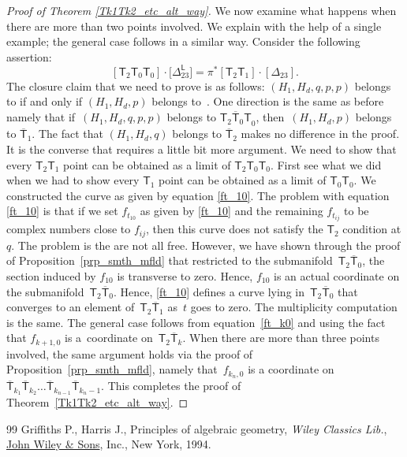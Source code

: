 \documentclass[11pt]{article}
\numberwithin{equation}{section}
\begin{document}
\begin{proof}[Proof of Theorem \ref{Tk1Tk2_etc_alt_way}]
We now examine what happens when there are more than two points involved.
We explain with the help of a single example; the general case follows in a similar way.
Consider the following assertion:
\[
[\mathsf{T}_2 \mathsf{T}_0 \mathsf{T}_0] \cdot \bigl[\Delta^{\mathsf{L}}_{23}\bigr]  =
\pi^*[\mathsf{T}_2\mathsf{T}_1]\cdot [\Delta_{23}].
\]
The closure claim that we need to prove is as follows:
$(H_1, H_d, q, p, p)$ belongs to 
if and only if $(H_1, H_d, p)$ belongs to~.
One direction is the same as before namely that if~${(H_1, H_d, q, p, p)}$ belongs to
$\overline{\mathsf{T}_2\mathsf{T}_0 \mathsf{T}}_0$, then~$(H_1, H_d, p)$ belongs to $\overline{\mathsf{T}}_{1}$. The fact that
$(H_1, H_d, q)$ belongs to $\overline{\mathsf{T}}_2$ makes no difference in the proof.
It is the converse that requires a little bit more argument. We need to show that
every $\mathsf{T}_2 \mathsf{T}_1$ point can be obtained as a limit of
$\mathsf{T}_2 \mathsf{T}_0 \mathsf{T}_0$. First see what we did when we
had to show every $\mathsf{T}_1$ point can be obtained as a limit of
$\mathsf{T}_0 \mathsf{T}_0$. We constructed the curve as given by equation
\eqref{ft_10}. The problem with equation \eqref{ft_10} is that if we set
$f_{t_{10}}$ as given by \eqref{ft_10} and the remaining $f_{t_{ij}}$ to be
complex numbers close to $f_{ij}$, then this curve does not satisfy the
$\mathsf{T}_2$ condition at $q$. The problem is the  are not all free.
However, we have shown through the proof of Proposition~\ref{prp_smth_mfld} that
restricted to the submanifold~$\mathsf{T}_2 \overline{\mathsf{T}}_0$, the section induced by $f_{10}$ is transverse to
zero. Hence, $f_{10}$ is an actual coordinate on the submanifold~$\mathsf{T}_2 \overline{\mathsf{T}}_0$.
Hence, \eqref{ft_10} defines a curve lying in~$\mathsf{T}_2 \overline{\mathsf{T}}_0$ that
converges to an element of~$\mathsf{T}_2 \overline{\mathsf{T}}_1$ as~$t$ goes to zero.
The multiplicity computation is the same. The general case follows from equation~\eqref{ft_k0} and using the fact that $f_{k+1, 0}$ is a~coordinate on~$\mathsf{T}_2 \overline{\mathsf{T}}_{k}$. When there are more than three points involved, the
same argument holds via the proof of Proposition~\ref{prp_smth_mfld},
namely that~$f_{k_n, 0}$ is a coordinate on
$\overline{\mathsf{T}}_{k_1} \overline{\mathsf{T}}_{k_2}
\dots \overline{\mathsf{T}}_{k_{n-1}}\overline{\mathsf{T}}_{k_{n}-1}$.
This completes the proof of Theorem~\ref{Tk1Tk2_etc_alt_way}.
 \end{proof}
\begin{thebibliography}{99}
Griffiths P., Harris J., Principles of algebraic geometry, \textit{Wiley Classics Lib.},
  \href{https://doi.org/10.1002/9781118032527}{John Wiley \& Sons}, Inc., New York, 1994.

\end{thebibliography}
\end{document}
